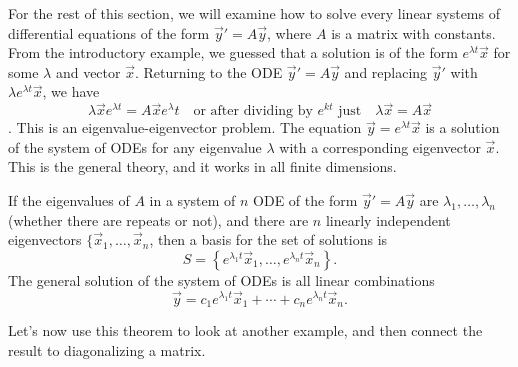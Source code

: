For the rest of this section, we will examine how to solve every linear systems of differential equations of the form $\vec y' = A\vec y$, where $A$ is a matrix with constants.  
From the introductory example, we guessed that a solution is of the form $e^{\lambda t}\vec x$ for some $\lambda$ and vector $\vec x$. Returning to the ODE $\vec y ' =A\vec y$ and replacing $\vec y'$ with $\lambda e^{\lambda t}\vec x$, we have $$\lambda \vec x e^{\lambda t}=A\vec x e^\lambda t \quad \text{or after dividing by $e^{kt}$ just}\quad \lambda \vec x =A\vec x$$. 
This is an eigenvalue-eigenvector problem. 
The equation $ \vec y=e^{\lambda t}\vec x$ is a solution of the system of ODEs for any eigenvalue $\lambda$ with a corresponding eigenvector $\vec x$. 
This is the general theory, and it works in all finite dimensions.  
\begin{theorem}
If the eigenvalues of $A$ in a system of $n$ ODE of the form $\vec y'=A\vec y$ are 
$\lambda_1,\ldots,\lambda_n$ (whether there are repeats or not), 
and there are $n$ linearly independent eigenvectors $\{\vec x_{1}, \ldots, \vec x_{n}$, 
then a basis for the set of solutions is
$$S=\left\{e^{\lambda_1 t}\vec x_{1},\ldots, e^{\lambda_n t}\vec x_{n} \right\}.$$
The general solution of the system of ODEs is all linear combinations 
$$\vec y = c_1e^{\lambda_1 t}\vec x_{1}  + \cdots + c_n e^{\lambda_n t}\vec x_{n}.$$ 
\end{theorem}
Let's now use this theorem to look at another example, and then connect the result to diagonalizing a matrix. 

